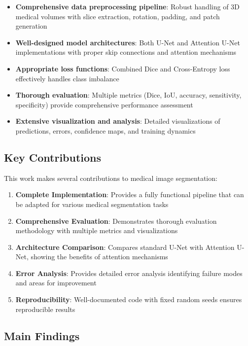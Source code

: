 \documentclass[12pt,a4paper]{article}
\begin{document}
\begin{itemize}
    \item \textbf{Comprehensive data preprocessing pipeline}: Robust handling of 3D medical volumes with slice extraction, rotation, padding, and patch generation
    \item \textbf{Well-designed model architectures}: Both U-Net and Attention U-Net implementations with proper skip connections and attention mechanisms
    \item \textbf{Appropriate loss functions}: Combined Dice and Cross-Entropy loss effectively handles class imbalance
    \item \textbf{Thorough evaluation}: Multiple metrics (Dice, IoU, accuracy, sensitivity, specificity) provide comprehensive performance assessment
    \item \textbf{Extensive visualization and analysis}: Detailed visualizations of predictions, errors, confidence maps, and training dynamics
\end{itemize}

\subsection{Key Contributions}

This work makes several contributions to medical image segmentation:

\begin{enumerate}
    \item \textbf{Complete Implementation}: Provides a fully functional pipeline that can be adapted for various medical segmentation tasks
    \item \textbf{Comprehensive Evaluation}: Demonstrates thorough evaluation methodology with multiple metrics and visualizations
    \item \textbf{Architecture Comparison}: Compares standard U-Net with Attention U-Net, showing the benefits of attention mechanisms
    \item \textbf{Error Analysis}: Provides detailed error analysis identifying failure modes and areas for improvement
    \item \textbf{Reproducibility}: Well-documented code with fixed random seeds ensures reproducible results
\end{enumerate}

\subsection{Main Findings}
\end{document}
